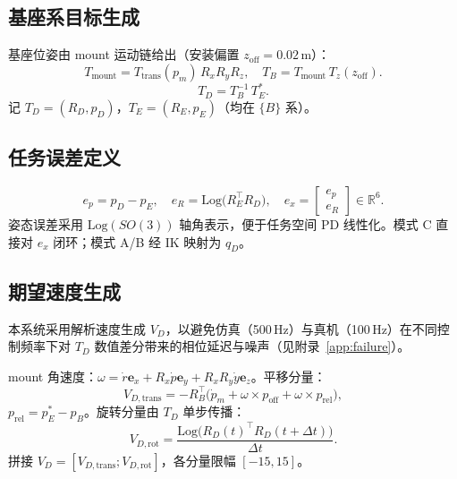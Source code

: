 \documentclass[UTF8, a4paper, 12pt]{ctexart}
\newcommand{\Log}{\mathrm{Log}}
\begin{document}
\subsection{基座系目标生成}

基座位姿由 mount 运动链给出（安装偏置 $z_{\mathrm{off}}=0.02$\,m）：
\begin{equation}
    T_{\mathrm{mount}} = T_{\mathrm{trans}}(p_m)\, R_x R_y R_z, \quad
    T_B = T_{\mathrm{mount}}\, T_z(z_{\mathrm{off}}).
\end{equation}
\begin{equation}
    T_D = T_B^{-1}\, T_E^*.
    \label{eq:td}
\end{equation}
记 $T_D=(R_D,p_D)$，$T_E=(R_E,p_E)$（均在 $\{B\}$ 系）。

\subsection{任务误差定义}

\begin{equation}
    e_p = p_D - p_E, \quad
    e_R = \Log\!\bigl(R_E^\top R_D\bigr), \quad
    e_x = \begin{bmatrix} e_p \\ e_R \end{bmatrix} \in \mathbb{R}^6.
    \label{eq:ex}
\end{equation}
姿态误差采用 $\Log(SO(3))$ 轴角表示，便于任务空间 PD 线性化。模式 C 直接对 $e_x$ 闭环；模式 A/B 经 IK 映射为 $q_D$。

\subsection{期望速度生成}

本系统采用解析速度生成 $V_D$，以避免仿真（500\,Hz）与真机（100\,Hz）在不同控制频率下对 $T_D$ 数值差分带来的相位延迟与噪声（见附录~\ref{app:failure}）。

mount 角速度：$\omega = \dot{r}\mathbf{e}_x + R_x\dot{p}\mathbf{e}_y + R_xR_y\dot{y}\mathbf{e}_z$。平移分量：
\begin{equation}
    V_{D,\mathrm{trans}} = -R_B^\top\bigl(\dot{p}_m + \omega \times p_{\mathrm{off}} + \omega \times p_{\mathrm{rel}}\bigr),
    \label{eq:vd-trans}
\end{equation}
$p_{\mathrm{rel}}=p_E^*-p_B$。旋转分量由 $T_D$ 单步传播：
\begin{equation}
    V_{D,\mathrm{rot}} = \frac{\Log\!\bigl(R_D(t)^\top R_D(t+\Delta t)\bigr)}{\Delta t}.
    \label{eq:vd-rot}
\end{equation}
拼接 $V_D=[V_{D,\mathrm{trans}};V_{D,\mathrm{rot}}]$，各分量限幅 $[-15,15]$。
\end{document}
